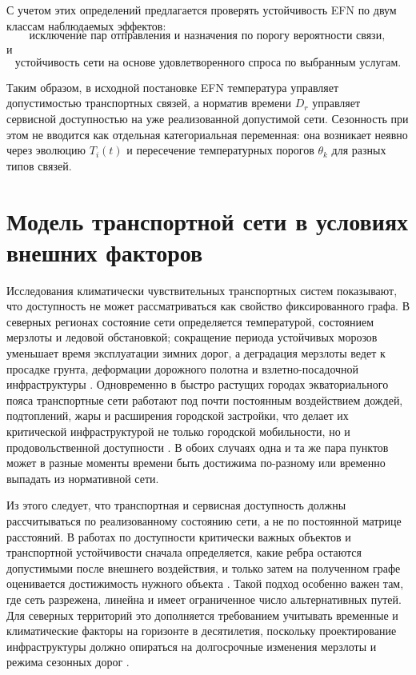 С учетом этих определений предлагается проверять устойчивость EFN
по двум классам наблюдаемых эффектов:
\begin{equation}
\text{исключение пар отправления и назначения по порогу вероятности связи},
\label{eq:od-deletion}
\end{equation}
и
\begin{equation}
\text{устойчивость сети на основе удовлетворенного спроса по выбранным услугам}.
\label{eq:fulfilled-demand}
\end{equation}

Таким образом, в исходной постановке EFN температура управляет допустимостью
транспортных связей, а норматив времени \(D_r\) управляет сервисной
доступностью на уже реализованной допустимой сети. Сезонность при этом не
вводится как отдельная категориальная переменная: она возникает
неявно через эволюцию \(T_i(t)\) и пересечение температурных порогов
\(\theta_k\) для разных типов связей.


\section{Модель транспортной сети в условиях внешних факторов}
\label{sec:environment-framed-network}

Исследования климатически чувствительных транспортных систем показывают, что
доступность не может рассматриваться как свойство фиксированного графа. В
северных регионах состояние сети определяется температурой, состоянием
мерзлоты и ледовой обстановкой; сокращение периода устойчивых морозов
уменьшает время эксплуатации зимних дорог, а деградация мерзлоты ведет к
просадке грунта, деформации дорожного полотна и взлетно-посадочной
инфраструктуры
\cite{dong2025iceRoads,waite2023arcticTransport,stephenson2011arcticAccess,
povoroznyuk2022arcticRoads}. Одновременно в быстро растущих городах
экваториального пояса транспортные сети работают под почти постоянным
воздействием дождей, подтоплений, жары и расширения городской застройки, что делает их
критической инфраструктурой не только городской мобильности, но и
продовольственной доступности \cite{reardon2018climateSmartSupply,
ofori2022accraFoodFlows,karg2022foodsheds,arifai2025urbanExpansion}. В обоих
случаях одна и та же пара пунктов может в разные моменты времени быть
достижима по-разному или временно выпадать из нормативной сети.

Из этого следует, что транспортная и сервисная доступность должны
рассчитываться по реализованному состоянию сети, а не по постоянной матрице
расстояний. В работах по доступности критически важных объектов и транспортной устойчивости сначала определяется, какие ребра остаются допустимыми после
внешнего воздействия, и только затем на полученном графе оценивается
достижимость нужного объекта \cite{gangwal2023criticalFacility,
yin2023transportResilience}. Такой подход особенно важен там, где сеть
разрежена, линейна и имеет ограниченное число альтернативных путей. Для
северных территорий это дополняется требованием учитывать временные и
климатические факторы на горизонте в десятилетия, поскольку проектирование
инфраструктуры должно опираться на долгосрочные изменения мерзлоты и режима
сезонных дорог \cite{waite2023arcticTransport,povoroznyuk2022arcticRoads}.


